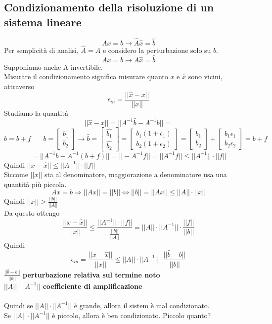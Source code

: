 \documentclass[10pt]{book}
\begin{document}
\subsection{Condizionamento della risoluzione di un sistema lineare}
$$Ax = b \longrightarrow \widehat{A}\widehat{x} = \widehat{b}$$
Per semplicità di analisi, $\widehat{A} = A$ e considero la perturbazione solo su $b$.
$$Ax = b \longrightarrow A\widehat{x} = \widehat{b}$$
Supponiamo anche A invertibile.\\
Misurare il condizionamento significa misurare quanto $x$ e $\widehat{x}$ sono vicini, attraverso $$\epsilon_{in} = \frac{||\widehat{x} - x||}{||x||}$$
Studiamo la quantità $$||\widehat{x} - x|| = ||A^{-1}\widehat{b} - A^{-1}b|| =$$
$$\widehat{b} = b + f\:\:\:\:\:\:\:\:b = \left[\begin{array}{c} b_1\\b_2 \end{array}\right] \rightarrow \widehat{b} = \left[\begin{array}{c} \widehat{b_1}\\\widehat{b_2} \end{array}\right] = \left[\begin{array}{c} b_1(1 + \epsilon_1)\\b_2(1 + \epsilon_2) \end{array}\right] = \left[\begin{array}{c} b_1\\b_2 \end{array}\right] + \left[\begin{array}{c} b_1\epsilon_1\\b_2\epsilon_2 \end{array}\right] = b + f$$
$$= ||A^{-1}b - A^{-1}(b + f)|| = ||-A^{-1}f|| = ||A^{-1}f|| \leq ||A^{-1}||\cdot||f||$$
Quindi $||x - \widehat{x}|| \leq ||A^{-1}||\cdot||f||$\\
Siccome $||x||$ sta al denominatore, maggiorazione a denominatore usa una quantità più piccola.
$$Ax = b \Rightarrow ||Ax|| = ||b|| \Leftrightarrow ||b|| = ||Ax|| \leq ||A||\cdot||x|| $$
Quindi $||x|| \geq \frac{||b||}{||A||}$\\
Da questo ottengo $$\frac{||x - \widehat{x}||}{||x||} \leq \frac{||A^{-1}||\cdot||f||}{\frac{||b||}{||A||}} = ||A||\cdot||A^{-1}||\cdot\frac{||f||}{||b||}$$
Quindi $$\epsilon_{in} = \frac{||x - \widehat{x}||}{||x||} \leq ||A||\cdot||A^{-1}||\cdot\frac{||\widehat{b} - b||}{||b||}$$
$\frac{||\widehat{b} - b||}{||b||}$ \textbf{perturbazione relativa sul termine noto}\\
$||A||\cdot||A^{-1}||$ \textbf{coefficiente di amplificazione}\\\\
Quindi se $||A||\cdot||A^{-1}||$ è grande, allora il sistem è mal condizionato.\\
Se $||A||\cdot||A^{-1}||$ è piccolo, allora è ben condizionato. Piccolo quanto?
\end{document}
